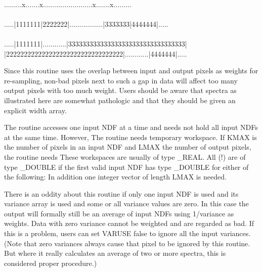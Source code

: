 {{{\ssttt
\ \\
.........x.......x.........................x.......x......... \\
\ \\
.....|1111111|2222222|.................|3333333|4444444|..... \\
\ \\ 
.....|1111111|............|333333333333333333333333333333333| \\ 
|222222222222222222222222222222222|............|4444444|.....
\ \\
}

      Since this routine uses the overlap between input and output
      pixels as weights for re-sampling, non-bad pixels next to such a
      gap in data will affect too many output pixels with too much
      weight.
      Users should be aware that spectra as illustrated here are
      somewhat pathologic and that they should be given an explicit
      width array.

      The routine accesses one input NDF at a time and needs not hold
      all input NDFs at the same time. However, The routine needs
      temporary workspace. If KMAX is the number of pixels in an input
      NDF and LMAX the number of output pixels, the routine needs
      These workspaces are usually of type \_REAL. All (!) are of type
      \_DOUBLE if the first valid input NDF has type \_DOUBLE for either
      of the following:
      In addition one integer vector of length LMAX is needed.

      There is an oddity about this routine if only one input NDF is
      used and its variance array is used and some or all variance
      values are zero. In this case the output will formally still be an
      average of input NDFs using 1/variance as weights. Data with zero
      variance cannot be weighted and are regarded as bad. If this is a
      problem, users can set VARUSE false to ignore all the input
      variances. (Note that zero variances always cause that pixel to be
      ignored by this routine. But where it really calculates an average
      of two or more spectra, this is considered proper procedure.)
   }
   }
